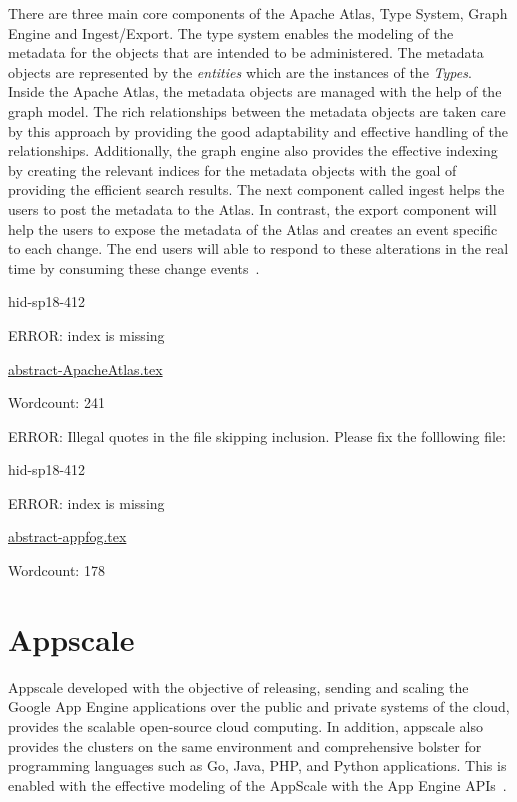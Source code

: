 There are three main core components of the Apache Atlas, Type System,
Graph Engine and Ingest/Export. The type system enables the modeling
of the metadata for the objects that are intended to be administered.
The metadata objects are represented by the \textit{entities} which
are the instances of the \textit{Types}. Inside the Apache Atlas, the
metadata objects are managed with the help of the graph model. The
rich relationships between the metadata objects are taken care by this
approach by providing the good adaptability and effective handling of
the relationships. Additionally, the graph engine also provides the
effective indexing by creating the relevant indices for the metadata
objects with the goal of providing the efficient search results. The
next component called ingest helps the users to post the metadata to
the Atlas. In contrast, the export component will help the users to
expose the metadata of the Atlas and creates an event specific to each
change. The end users will able to respond to these alterations in the
real time by consuming these change
events~\cite{hid-sp18-412-Apache_Atlas_architecture}.



\begin{IU}

hid-sp18-412

ERROR: index is missing

\href{https://github.com/cloudmesh-community/hid-sp18-412/blob/master//technology/abstract-ApacheAtlas.tex}{abstract-ApacheAtlas.tex}

 

Wordcount: 241

\end{IU}

ERROR: Illegal quotes in the file skipping inclusion. Please fix the folllowing file:

\begin{IU}

hid-sp18-412

ERROR: index is missing

\href{https://github.com/cloudmesh-community/hid-sp18-412/blob/master//technology/abstract-appfog.tex}{abstract-appfog.tex}

 

Wordcount: 178

\end{IU}

\section{Appscale}
Appscale developed with the objective of releasing, sending and scaling 
the Google App Engine applications over the public and private systems 
of the cloud, provides the scalable open-source cloud computing. 
In addition, appscale also provides the clusters on the same environment 
and comprehensive bolster for programming languages such as Go, Java, PHP, 
and Python applications. This is enabled with the effective modeling
of the AppScale with the App Engine APIs~\cite{hid-sp18-412-wiki_appscale}.

